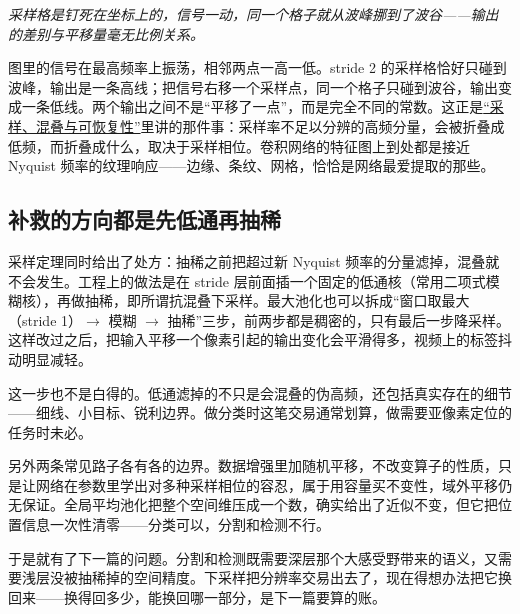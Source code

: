 \emph{采样格是钉死在坐标上的，信号一动，同一个格子就从波峰挪到了波谷——输出的差别与平移量毫无比例关系。}

图里的信号在最高频率上振荡，相邻两点一高一低。stride 2 的采样格恰好只碰到波峰，输出是一条高线；把信号右移一个采样点，同一个格子只碰到波谷，输出变成一条低线。两个输出之间不是``平移了一点''，而是完全不同的常数。这正是\hyperref[sec:08-Numerical-Analysis/08-Fourier-and-Spectral-Methods/02]{``采样、混叠与可恢复性''}里讲的那件事：采样率不足以分辨的高频分量，会被折叠成低频，而折叠成什么，取决于采样相位。卷积网络的特征图上到处都是接近 Nyquist 频率的纹理响应——边缘、条纹、网格，恰恰是网络最爱提取的那些。

\subsection{补救的方向都是先低通再抽稀}

采样定理同时给出了处方：抽稀之前把超过新 Nyquist 频率的分量滤掉，混叠就不会发生。工程上的做法是在 stride 层前面插一个固定的低通核（常用二项式模糊核），再做抽稀，即所谓抗混叠下采样。最大池化也可以拆成``窗口取最大（stride 1）\(\to\) 模糊 \(\to\) 抽稀''三步，前两步都是稠密的，只有最后一步降采样。这样改过之后，把输入平移一个像素引起的输出变化会平滑得多，视频上的标签抖动明显减轻。

这一步也不是白得的。低通滤掉的不只是会混叠的伪高频，还包括真实存在的细节——细线、小目标、锐利边界。做分类时这笔交易通常划算，做需要亚像素定位的任务时未必。

另外两条常见路子各有各的边界。数据增强里加随机平移，不改变算子的性质，只是让网络在参数里学出对多种采样相位的容忍，属于用容量买不变性，域外平移仍无保证。全局平均池化把整个空间维压成一个数，确实给出了近似不变，但它把位置信息一次性清零——分类可以，分割和检测不行。

于是就有了下一篇的问题。分割和检测既需要深层那个大感受野带来的语义，又需要浅层没被抽稀掉的空间精度。下采样把分辨率交易出去了，现在得想办法把它换回来——换得回多少，能换回哪一部分，是下一篇要算的账。

